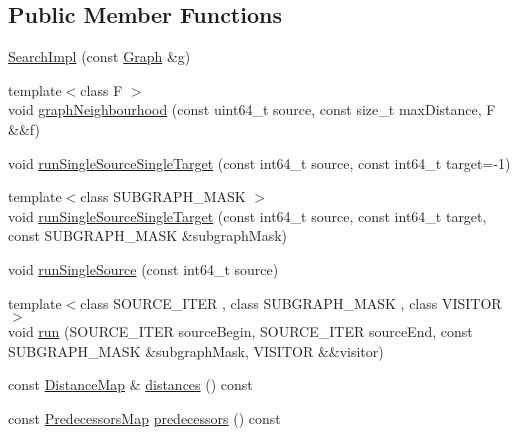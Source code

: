 \subsection*{Public Member Functions}
\begin{DoxyCompactItemize}
\item 
\hyperlink{classnifty_1_1graph_1_1detail__graph_1_1SearchImpl_ae3b7de8fe1eb6d2f56eb87e6073522ed}{Search\+Impl} (const \hyperlink{classnifty_1_1graph_1_1detail__graph_1_1SearchImpl_a8426363c518ca7ef2383b5cb1f06713d}{Graph} \&g)
\item 
{\footnotesize template$<$class F $>$ }\\void \hyperlink{classnifty_1_1graph_1_1detail__graph_1_1SearchImpl_a9c1d6dd401e9557df0f3a3a186ce13c1}{graph\+Neighbourhood} (const uint64\+\_\+t source, const size\+\_\+t max\+Distance, F \&\&f)
\item 
void \hyperlink{classnifty_1_1graph_1_1detail__graph_1_1SearchImpl_ae8e3bf7786467e899abb8c4507fc77fe}{run\+Single\+Source\+Single\+Target} (const int64\+\_\+t source, const int64\+\_\+t target=-\/1)
\item 
{\footnotesize template$<$class S\+U\+B\+G\+R\+A\+P\+H\+\_\+\+M\+A\+S\+K $>$ }\\void \hyperlink{classnifty_1_1graph_1_1detail__graph_1_1SearchImpl_ab662caa4f11668c78c516554dc6a97a1}{run\+Single\+Source\+Single\+Target} (const int64\+\_\+t source, const int64\+\_\+t target, const S\+U\+B\+G\+R\+A\+P\+H\+\_\+\+M\+A\+S\+K \&subgraph\+Mask)
\item 
void \hyperlink{classnifty_1_1graph_1_1detail__graph_1_1SearchImpl_af5ed3bebeeea7d64e9d4118732514fb5}{run\+Single\+Source} (const int64\+\_\+t source)
\item 
{\footnotesize template$<$class S\+O\+U\+R\+C\+E\+\_\+\+I\+T\+E\+R , class S\+U\+B\+G\+R\+A\+P\+H\+\_\+\+M\+A\+S\+K , class V\+I\+S\+I\+T\+O\+R $>$ }\\void \hyperlink{classnifty_1_1graph_1_1detail__graph_1_1SearchImpl_a8210b1709b1222c575b5c3e0a591be1f}{run} (S\+O\+U\+R\+C\+E\+\_\+\+I\+T\+E\+R source\+Begin, S\+O\+U\+R\+C\+E\+\_\+\+I\+T\+E\+R source\+End, const S\+U\+B\+G\+R\+A\+P\+H\+\_\+\+M\+A\+S\+K \&subgraph\+Mask, V\+I\+S\+I\+T\+O\+R \&\&visitor)
\item 
const \hyperlink{classnifty_1_1graph_1_1detail__graph_1_1SearchImpl_abbd31f7e73ba6851a8f955cd64d59917}{Distance\+Map} \& \hyperlink{classnifty_1_1graph_1_1detail__graph_1_1SearchImpl_ac6aa3c3e65115983363273fe86e25a65}{distances} () const 
\item 
const \hyperlink{classnifty_1_1graph_1_1detail__graph_1_1SearchImpl_ae495d858111c13b737fe264a12a273c8}{Predecessors\+Map} \hyperlink{classnifty_1_1graph_1_1detail__graph_1_1SearchImpl_ae3a10a297cde6846106aedc9812cebc3}{predecessors} () const 
\end{DoxyCompactItemize}


